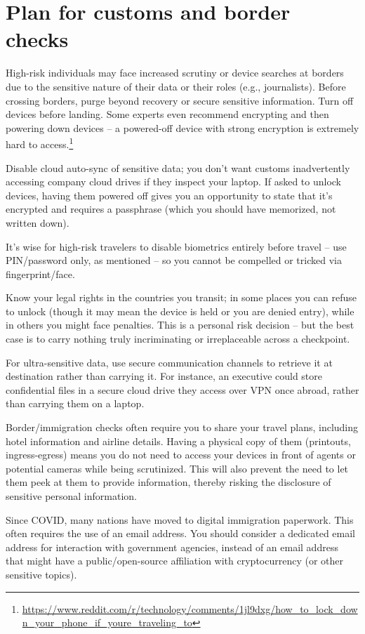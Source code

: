 \section{Plan for customs and border checks}

High-risk individuals may face increased scrutiny or
device searches at borders due to the sensitive nature of
their data or their roles (e.g., journalists). Before
crossing borders, purge beyond recovery or secure
sensitive information. Turn off devices before landing.
Some experts even recommend encrypting and then powering
down devices -- a powered-off device with strong
encryption is extremely hard to
access.\footnote{\url{https://www.reddit.com/r/technology/comments/1jl9dxg/how_to_lock_down_your_phone_if_youre_traveling_to}}

Disable cloud auto-sync of sensitive data; you don't want
customs inadvertently accessing company cloud drives if
they inspect your laptop. If asked to unlock devices,
having them powered off gives you an opportunity to state
that it's encrypted and requires a passphrase (which you
should have memorized, not written down).

It's wise for high-risk travelers to disable biometrics
entirely before travel -- use PIN/password only, as
mentioned -- so you cannot be compelled or tricked via
fingerprint/face.

Know your legal rights in the countries you transit; in
some places you can refuse to unlock (though it may mean
the device is held or you are denied entry), while in
others you might face penalties. This is a personal risk
decision -- but the best case is to carry nothing truly
incriminating or irreplaceable across a checkpoint.

For ultra-sensitive data, use secure communication
channels to retrieve it at destination rather than
carrying it. For instance, an executive could store
confidential files in a secure cloud drive they access
over VPN once abroad, rather than carrying them on a
laptop.

Border/immigration checks often require you to share your
travel plans, including hotel information and airline
details. Having a physical copy of them (printouts,
ingress-egress) means you do not need to access your
devices in front of agents or potential cameras while
being scrutinized. This will also prevent the need to let
them peek at them to provide information, thereby risking
the disclosure of sensitive personal information.

Since COVID, many nations have moved to digital
immigration paperwork. This often requires the use of an
email address. You should consider a dedicated email
address for interaction with government agencies, instead
of an email address that might have a public/open-source
affiliation with cryptocurrency (or other sensitive
topics).

